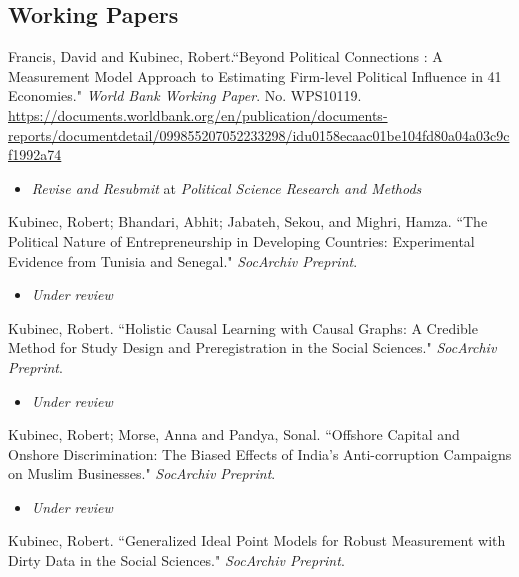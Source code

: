 \documentclass[11pt, a4paper]{article}
\newcommand{\years}[1]{\marginnote{\scriptsize #1}}
\begin{document}
\subsection*{Working Papers}
\noindent

\years{2023}  Francis, David and Kubinec, Robert.``Beyond Political Connections : A Measurement Model Approach to Estimating Firm-level Political Influence in 41 Economies." \emph{World Bank Working Paper}. No. WPS10119. \url{https://documents.worldbank.org/en/publication/documents-reports/documentdetail/099855207052233298/idu0158ecaac01be104fd80a04a03c9cf1992a74}\\

\begin{itemize}
	\item \emph{Revise and Resubmit} at \emph{Political Science Research and Methods}
\end{itemize}

\years{2024} Kubinec, Robert; Bhandari, Abhit; Jabateh, Sekou, and Mighri, Hamza. ``The Political Nature of Entrepreneurship in Developing Countries: Experimental Evidence from Tunisia and Senegal." \emph{SocArchiv Preprint}. \\

\begin{itemize}
	\item \emph{Under review}
\end{itemize}

\years{2023} Kubinec, Robert. ``Holistic Causal Learning with Causal Graphs: A Credible Method for Study Design and Preregistration in the Social Sciences." \emph{SocArchiv Preprint}. \\

\begin{itemize}
	\item \emph{Under review}
\end{itemize}

\years{2023} Kubinec, Robert; Morse, Anna and Pandya, Sonal. ``Offshore Capital and Onshore Discrimination: The Biased Effects of India's Anti-corruption Campaigns on Muslim Businesses." \emph{SocArchiv Preprint}. \\

\begin{itemize}
	\item \emph{Under review}
\end{itemize}

\years{2024} Kubinec, Robert. ``Generalized Ideal Point Models for Robust Measurement with Dirty Data in the Social Sciences." \emph{SocArchiv Preprint}. \\
\end{document}
